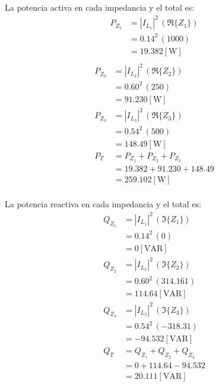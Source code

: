 \documentclass[letter,11pt]{article}
\begin{document}
\begin{enumerate}
La potencia activa en cada impedancia y el total es:
\begin{equation*}
    \begin{split}
        P_{Z_1} &= |I_{L_1}|^2\,(\Re\{Z_1\})\\
                &= 0.14^2\,(1000)\\
                &= 19.382[\text{W}]\\
    \end{split}
\end{equation*}
\begin{equation*}
    \begin{split}
        P_{Z_2} &= |I_{L_2}|^2\,(\Re\{Z_2\})\\
                &= 0.60^2\,(250)\\
                &= 91.230[\text{W}]\\
        P_{Z_3} &= |I_{L_3}|^2\,(\Re\{Z_3\})\\
                &= 0.54^2\,(500)\\
                &= 148.49[\text{W}]\\
        P_T &= P_{Z_1} + P_{Z_2} + P_{Z_3}\\
            &= 19.382 + 91.230 + 148.49\\
            &= 259.102[\text{W}]\\
    \end{split}
\end{equation*}

La potencia reactiva en cada impedancia y el total es:
\begin{equation*}
    \begin{split}
        Q_{Z_1} &= |I_{L_1}|^2\,(\Im\{Z_1\})\\
                &= 0.14^2\,(0)\\
                &= 0[\text{VAR}]\\
        Q_{Z_2} &= |I_{L_2}|^2\,(\Im\{Z_2\})\\
                &= 0.60^2\,(314.161)\\
                &= 114.64[\text{VAR}]\\
        Q_{Z_3} &= |I_{L_3}|^2\,(\Im\{Z_3\})\\
                &= 0.54^2\,(-318.31)\\
                &= -94.532[\text{VAR}]\\
        Q_T &= Q_{Z_1} + Q_{Z_2} + Q_{Z_3}\\
            &= 0 + 114.64 - 94.532\\
            &= 20.111[\text{VAR}]\\
    \end{split}
\end{equation*}


\end{enumerate}
\end{document}
